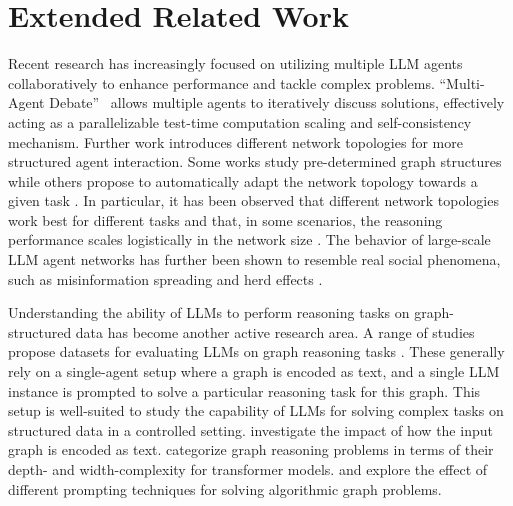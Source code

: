 \documentclass{article}
\begin{document}
\section{Extended Related Work}
\label{appendix:extended_rw}
Recent research has increasingly focused on utilizing multiple LLM agents collaboratively to enhance performance and tackle complex problems.
``Multi-Agent Debate''~\citep{du2023improving,xiong2023examining,liang2024encouraging} allows multiple agents to iteratively discuss solutions, effectively acting as a parallelizable test-time computation scaling and self-consistency mechanism.
Further work introduces different network topologies for more structured agent interaction.
Some works study pre-determined graph structures \citep{regan2024problem,qian2024scaling}
while others propose to automatically adapt the network topology towards a given task \citep{liu2023dynamic,chen2024agentverse,zhuge2024gptswarm}.  
In particular, it has been observed that different network topologies work best for different tasks \citep{chen2024agentverse,zhuge2024gptswarm} and that, in some scenarios, the reasoning performance scales logistically in the network size \citep{qian2024scaling}.
The behavior of large-scale LLM agent networks has further been shown to resemble real social phenomena, such as misinformation spreading and herd effects \citep{yang2024oasisopenagentsocial,chuang2024simulating}.

Understanding the ability of LLMs to perform reasoning tasks on graph-structured data has become another active research area.
A range of studies propose datasets for evaluating LLMs on graph reasoning tasks \citep{fatemi2024talk,wang2024can,zhang2024llm4dyg,tang2025evaluating,skianis2024graphreasoninglargelanguage}.
These generally rely on a single-agent setup where a graph is encoded as text, and a single LLM instance is prompted to solve a particular reasoning task for this graph.
This setup is well-suited to study the capability of LLMs for solving complex tasks on structured data in a controlled setting.
\citet{fatemi2024talk} investigate the impact of how the input graph is encoded as text.
\citet{sanford2024understanding} categorize graph reasoning problems in terms of their depth- and width-complexity for transformer models.
\citet{wang2024can} and \citet{skianis2024graphreasoninglargelanguage} explore the effect of different prompting techniques for solving algorithmic graph problems.
\end{document}
